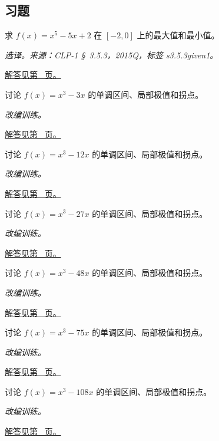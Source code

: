 \documentclass[UTF8,12pt,a4paper,fontset=fandol]{ctexart}
\begin{document}
\subsection{习题}
\begin{example}[闭区间最值的候选点]\label{ex:c11q1}
求 $f(x)=x^5-5x+2$ 在 $[-2,0]$ 上的最大值和最小值。
\par\textit{选译。来源：CLP-1 \S~3.5.3，2015Q，标签 s3.5.3given1。}\par\hyperref[ans:c11q1]{解答见第~\pageref{ans:c11q1} 页。}
\end{example}
\begin{example}[三次函数的极值与凹凸]\label{ex:c11q2}
讨论 $f(x)=x^3-3x$ 的单调区间、局部极值和拐点。
\par\textit{改编训练。}\par\hyperref[ans:c11q2]{解答见第~\pageref{ans:c11q2} 页。}
\end{example}
\begin{example}[三次函数的极值与凹凸]\label{ex:c11q3}
讨论 $f(x)=x^3-12x$ 的单调区间、局部极值和拐点。
\par\textit{改编训练。}\par\hyperref[ans:c11q3]{解答见第~\pageref{ans:c11q3} 页。}
\end{example}
\begin{example}[三次函数的极值与凹凸]\label{ex:c11q4}
讨论 $f(x)=x^3-27x$ 的单调区间、局部极值和拐点。
\par\textit{改编训练。}\par\hyperref[ans:c11q4]{解答见第~\pageref{ans:c11q4} 页。}
\end{example}
\begin{example}[三次函数的极值与凹凸]\label{ex:c11q5}
讨论 $f(x)=x^3-48x$ 的单调区间、局部极值和拐点。
\par\textit{改编训练。}\par\hyperref[ans:c11q5]{解答见第~\pageref{ans:c11q5} 页。}
\end{example}
\begin{example}[三次函数的极值与凹凸]\label{ex:c11q6}
讨论 $f(x)=x^3-75x$ 的单调区间、局部极值和拐点。
\par\textit{改编训练。}\par\hyperref[ans:c11q6]{解答见第~\pageref{ans:c11q6} 页。}
\end{example}
\begin{example}[三次函数的极值与凹凸]\label{ex:c11q7}
讨论 $f(x)=x^3-108x$ 的单调区间、局部极值和拐点。
\par\textit{改编训练。}\par\hyperref[ans:c11q7]{解答见第~\pageref{ans:c11q7} 页。}
\end{example}
\end{document}
